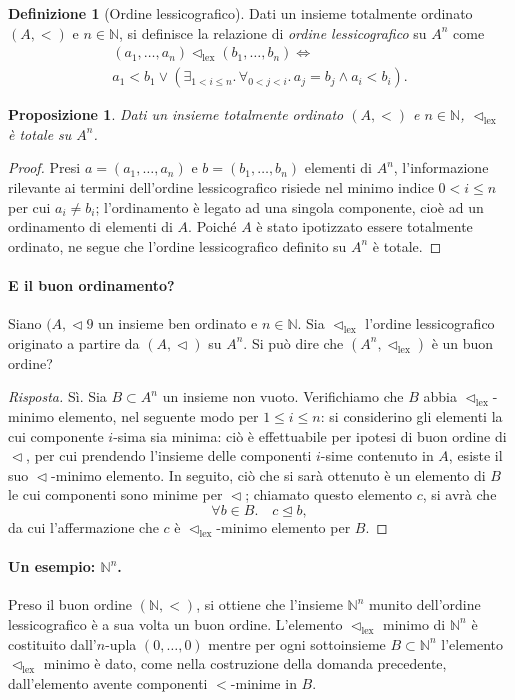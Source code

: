 \documentclass[fontsize = 11 pt, paper=A4, oneside, index=totoc, hyperref]{book}
\theoremstyle{definition}
\newtheorem{dfn}{Definizione}[]
\theoremstyle{plain}
\newtheorem{prp}{Proposizione}[section]
\newcommand{\N}{\mathbb{N}}
\newcommand{\order}{\vartriangleleft}
\newcommand{\ordine}[1]{\vartriangleleft_{\mathrm{#1}}}
\begin{document}
\begin{dfn}[Ordine lessicografico]
  Dati un insieme totalmente ordinato \((A,<)\) e \(n \in \N\), si definisce la relazione di \emph{ordine lessicografico} su \(A^n\) come
  \begin{multline}
    (a_1,\dots,a_n) \ordine{lex} (b_1,\dots,b_n) \iff \\ a_1 < b_1 \lor \left( \exists_{1 < i \le n}.\, \forall_{0 < j < i}.\, a_j = b_j \land a_i < b_i\right).
  \end{multline}
\end{dfn}
\begin{prp}
  Dati un insieme totalmente ordinato \((A, <)\) e \(n \in \N\), \(\ordine{lex}\) è totale su \(A^n\).
\end{prp}
\begin{proof}
  Presi \(a = (a_1,\dots,a_n)\) e \(b = (b_1,\dots,b_n)\) elementi di \(A^n\), l'informazione rilevante ai termini dell'ordine lessicografico risiede nel minimo indice \(0 < i \le n\) per cui \(a_i \neq b_i\); l'ordinamento è legato ad una singola componente, cioè ad un ordinamento di elementi di \(A\). Poiché \(A\) è stato ipotizzato essere totalmente ordinato, ne segue che l'ordine lessicografico definito su \(A^n\) è totale.
\end{proof}

\paragraph{E il buon ordinamento?} Siano \((A,\order9\) un insieme ben ordinato e \(n \in \N\). Sia \(\ordine{lex}\) l'ordine lessicografico originato a partire da \((A,\order)\) su \(A^n\). Si può dire che \((A^n,\ordine{lex})\) è un buon ordine?
\begin{proof}[Risposta]
  Sì. Sia \(B \subset A^n\) un insieme non vuoto. Verifichiamo che \(B\) abbia \(\ordine{lex}\)-minimo elemento, nel seguente modo per \(1 \le i \le n\): si considerino gli elementi la cui componente \(i\)-sima sia minima: ciò è effettuabile per ipotesi di buon ordine di \(\order\), per cui prendendo l'insieme delle componenti \(i\)-sime contenuto in \(A\), esiste il suo \(\order\)-minimo elemento. In seguito, ciò che si sarà ottenuto è un elemento di \(B\) le cui componenti sono minime per \(\order\); chiamato questo elemento \(c\), si avrà che
  \[
  \forall b \in B.\quad c \trianglelefteq b,
  \]
  da cui l'affermazione che \(c\) è \(\ordine{lex}\)-minimo elemento per \(B\).
\end{proof}
\paragraph{Un esempio: \(\N^n\).} Preso il buon ordine \((\N, <)\), si ottiene che l'insieme \(\N^n\) munito dell'ordine lessicografico è a sua volta un buon ordine. L'elemento \(\ordine{lex}\) minimo di \(\N^n\) è costituito dall'\(n\)-upla \((0,\dots,0)\) mentre per ogni sottoinsieme \(B \subset \N^n\) l'elemento \(\ordine{lex}\) minimo è dato, come nella costruzione della domanda precedente, dall'elemento avente componenti \(<\)-minime in \(B\).
\end{document}
